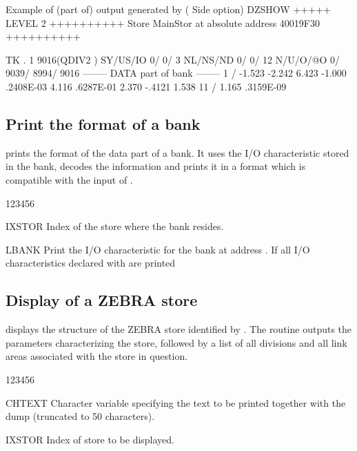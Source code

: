 \begin{landscapebody}
\begin{XMPt}{Example of (part of) output generated by  ( Side option)}
DZSHOW  +++++ LEVEL     2 ++++++++++            Store  MainStor at absolute address 40019F30      ++++++++++                     
                                                                                                                                 
 TK  .     1     9016(QDIV2   ) SY/US/IO    0/    0/   3 NL/NS/ND    0/    0/      12 N/U/O/@O       0/    9039/    8994/    9016
--------  DATA part of bank  --------                                                                                            
      1 /  -1.523      -2.242       6.423      -1.000       .2408E-03   4.116       .6287E-01   2.370      -.4121       1.538    
     11 /   1.165       .3159E-09                                                                                                
\end{XMPt}
\end{landscapebody}
\subsection{Print the format of a bank}
\Action
{} prints the format of the data part of a bank.
It uses the I/O characteristic stored in the bank, decodes the
information and prints it in a format which is compatible with the
input of .

\begin{DLtt}{123456}
\item[IXSTOR]Index of the store where the bank resides.
\item[LBANK]Print the I/O characteristic for the bank at address .
\newline If  all I/O characteristics declared with
 are printed
\end{DLtt}
\subsection{Display of a ZEBRA store}


\Action
{} displays the structure of the ZEBRA store identified by
.
The routine outputs the parameters characterizing the store, followed by a
list of all divisions and all link areas associated with the store in
question.

\begin{DLtt}{123456}
\item[CHTEXT]Character variable specifying the text to be printed
together with the dump (truncated to 50 characters).
\item[IXSTOR]Index of store to be displayed.
\end{DLtt}

